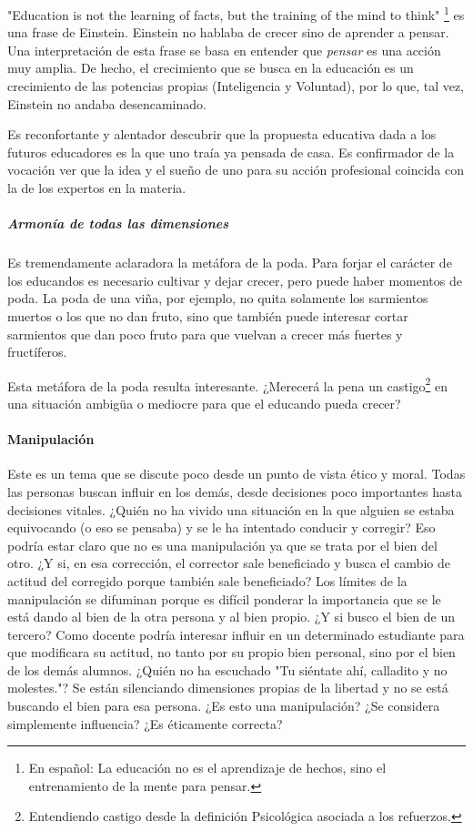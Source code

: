 "Education is not the learning of facts, but the training of the mind to think" \footnote{En español: La educación no es el aprendizaje de hechos, sino el entrenamiento de la mente para pensar.} es una frase de Einstein.
%
Einstein no hablaba de crecer sino de aprender a pensar. 
%
Una interpretación de esta frase se basa en entender que \textit{pensar} es una acción muy amplia. 
%
De hecho, el crecimiento que se busca en la educación es un crecimiento de las potencias propias (Inteligencia y Voluntad), por lo que, tal vez, Einstein no andaba desencaminado.

Es reconfortante y alentador descubrir que la propuesta educativa dada a los futuros educadores es la que uno traía ya pensada de casa.
%
Es confirmador de la vocación ver que la idea y el sueño de uno para su acción profesional coincida con la de los expertos en la materia.


\subparagraph{Armonía de todas las dimensiones} 
%
Es tremendamente aclaradora la metáfora de la poda.
%
Para forjar el carácter de los educandos es necesario cultivar y dejar crecer, pero puede haber momentos de poda.
%
La poda de una viña, por ejemplo, no quita solamente los sarmientos muertos o los que no dan fruto, sino que también puede interesar cortar sarmientos que dan poco fruto para que vuelvan a crecer más fuertes y fructíferos.

Esta metáfora de la poda resulta interesante. 
%
¿Merecerá la pena un castigo\footnote{Entendiendo castigo desde la definición Psicológica asociada a los refuerzos.} en una situación ambigüa o mediocre para que el educando pueda crecer?



\paragraph{Manipulación} 
%
Este es un tema que se discute poco desde un punto de vista ético y moral.
%
Todas las personas buscan influir en los demás, desde decisiones poco importantes hasta decisiones vitales.
%
¿Quién no ha vivido una situación en la que alguien se estaba equivocando (o eso se pensaba) y se le ha intentado conducir y corregir? 
%
Eso podría estar claro que no es una manipulación ya que se trata por el bien del otro.
%
¿Y si, en esa corrección, el corrector sale beneficiado y busca el cambio de actitud del corregido porque también sale beneficiado?
%
Los límites de la manipulación se difuminan porque es difícil ponderar la importancia que se le está dando al bien de la otra persona y al bien propio.
%
¿Y si busco el bien de un tercero?
%
Como docente podría interesar influir en un determinado estudiante para que modificara su actitud, no tanto por su propio bien personal, sino por el bien de los demás alumnos.
%
¿Quién no ha escuchado "Tu siéntate ahí, calladito y no molestes."?
%
Se están silenciando dimensiones propias de la libertad y no se está buscando el bien para esa persona.
%
¿Es esto una manipulación? ¿Se considera simplemente influencia? ¿Es éticamente correcta?

